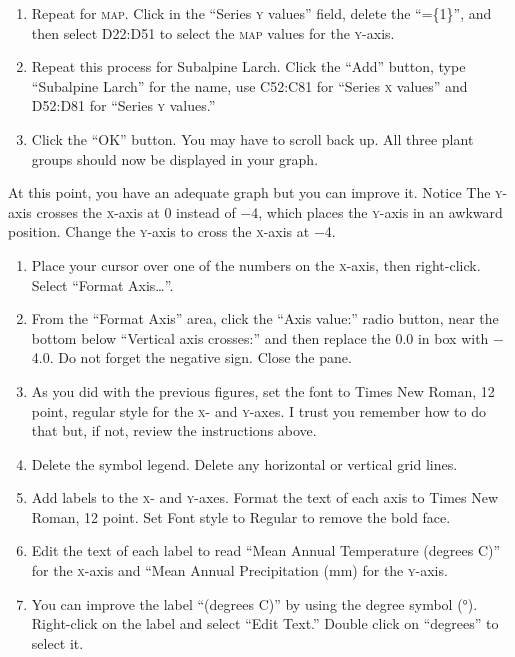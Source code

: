 \documentclass[12pt, hidelinks]{exam}
\newcommand*\axis[1]{{\scshape #1}-axis}
\begin{document}
\begin{questions}
\begin{enumerate}[resume]
	\item Repeat for \textsc{map}. Click in the “Series \textsc{y} values” field, delete the “=\{1\}”, and then select {\liningnum D22:D51} to select the \textsc{map} values for the \axis{y}. 

	\item Repeat this process for Subalpine Larch. Click the “Add” button, type “Subalpine Larch” for the name, use {\liningnum C52:C81} for “Series \textsc{x} values” and D52:D81 for “Series \textsc{y} values.” 

	\item Click the “OK” button. You may have to scroll back up. All three plant groups should now be displayed in your graph. 
\end{enumerate}

At this point, you have an adequate graph but you can improve it. Notice The \axis{y} crosses the \axis{x} at 0 instead of $-$4, which places the \axis{y} in an awkward position. Change the \axis{y} to cross the \axis{x} at $-$4.

\begin{enumerate}[resume]
	\item Place your cursor over one of the numbers on the \axis{x}, then right-click. Select “Format Axis\dots”.

	\item From the “Format Axis” area, click the “Axis value:” radio button, near the bottom below “Vertical axis crosses:” and then replace the 0.0 in box with $-$4.0. Do not forget the negative sign. Close the pane.

	\item As you did with the previous figures, set the font to Times New Roman, 12 point, regular style for the \textsc{x}- and \textsc{y}-axes. I trust you remember how to do that but, if not, review the instructions above.
	
	\item Delete the symbol legend. Delete any horizontal or vertical grid lines.

	\item Add labels to the \textsc{x}- and \textsc{y}-axes. Format the text of each axis to Times New Roman, 12 point. Set Font style to Regular to remove the bold face.

	\item Edit the text of each label to read “Mean Annual Temperature (degrees C)” for the \axis{x} and “Mean Annual Precipitation (mm) for the \axis{y}.

	\item You can improve the label “(degrees C)” by using the degree symbol (°). Right-click on the label and select “Edit Text.” Double click on “degrees” to select it.


\end{enumerate}
\end{questions}
\end{document}
